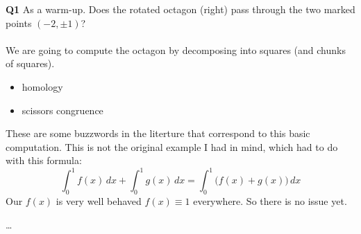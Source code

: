 \documentclass[12pt]{article}
\begin{document}
\textbf{Q1} As a warm-up.  Does the rotated octagon (right) pass through the two marked points $(-2, \pm 1)$? \\ \\
We are going to compute the octagon by decomposing into squares (and chunks of squares).
\begin{itemize}
\item homology
\item scissors congruence
\end{itemize}
These are some buzzwords in the literture that correspond to this basic computation.  This is not the original example I had in mind, which had to do with this formula:
$$ \int_0^1 f(x) \, dx 
+ \int_0^1 g(x) \, dx = \int_0^1 \Big( f(x) + g(x) \Big) \, dx$$
Our $f(x)$ is very well behaved $f(x) \equiv 1$ everywhere.  So there is no issue yet.

\vfill

\selectfont \fontsize{12}{10}\selectfont

\begin{thebibliography}{}



\item  \dots

\end{thebibliography}
\end{document}
